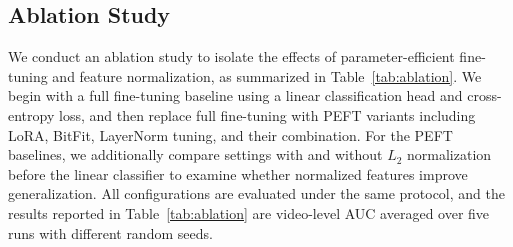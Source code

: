 \documentclass[fonts]{icst}
\begin{document}
\subsection{Ablation Study}
We conduct an ablation study to isolate the effects of parameter-efficient fine-tuning and feature normalization, as summarized in Table~\ref{tab:ablation}.
We begin with a full fine-tuning baseline using a linear classification head and cross-entropy loss, and then replace full fine-tuning with PEFT variants including LoRA, BitFit, LayerNorm tuning, and their combination.
For the PEFT baselines, we additionally compare settings with and without $L_2$ normalization before the linear classifier to examine whether normalized features improve generalization.
All configurations are evaluated under the same protocol, and the results reported in Table~\ref{tab:ablation} are video-level AUC averaged over five runs with different random seeds.

\begin{table}[h]
  \centering
  \captionsetup{labelsep=period, labelfont=bf, hypcap=false}
  \caption{Ablation study of PEFT variants and the effect of $L_2$ normalization before the linear classifier.
Results are reported as video-level AUC averaged over five runs.}
  \label{tab:ablation}
  \footnotesize
  \setlength{\tabcolsep}{3pt}
  \renewcommand{\arraystretch}{1.1}
\end{table}
\end{document}
